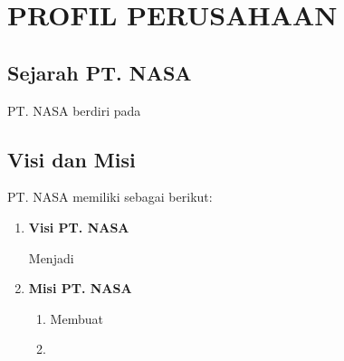 \chapter{PROFIL PERUSAHAAN}
\vspace{4ex}

\setlength{\parindent}{7ex}


\section{Sejarah PT. NASA}
\vspace{1ex}

PT. NASA berdiri pada \lipsum[1]
\vspace{0.5ex}

\lipsum[2]
\vspace{0.5ex}

\newpage

\section{Visi dan Misi}
\vspace{1ex}

PT. NASA memiliki \lipsum[1][1] sebagai berikut:
\vspace{0.5ex}

\begin{enumerate}[nolistsep]

  \item \textbf{Visi PT. NASA}
  \vspace{0.5ex}

  Menjadi \lipsum[1][1-3]
  \vspace{0.5ex}

  \item \textbf{Misi PT. NASA}
  \vspace{0.5ex}

  \begin{enumerate}[nolistsep]

    \item Membuat \lipsum[1][1-2]
    \vspace{0.5ex}

    \item \lipsum[1][3-4]
    \vspace{0.5ex}

  \end{enumerate}
  \vspace{0.5ex}

\end{enumerate}
\vspace{0.5ex}

